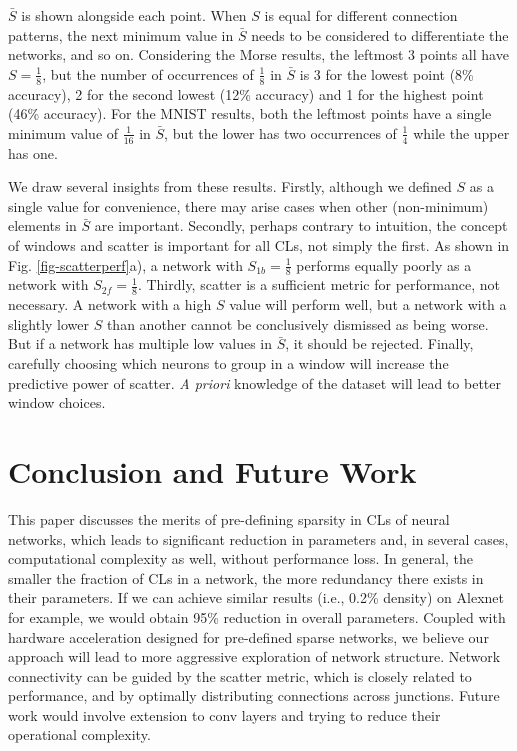 \documentclass[conference]{IEEEtran}
\begin{document}
$\bar{S}$ is shown alongside each point. When $S$ is equal for different connection patterns, the next minimum value in $\bar{S}$ needs to be considered to differentiate the networks, and so on. Considering the Morse results, the leftmost 3 points all have $S = \frac{1}{8}$, but the number of occurrences of $\frac{1}{8}$ in $\bar{S}$ is 3 for the lowest point (8\% accuracy), 2 for the second lowest (12\% accuracy) and 1 for the highest point (46\% accuracy). For the MNIST results, both the leftmost points have a single minimum value of $\frac{1}{16}$ in $\bar{S}$, but the lower has two occurrences of $\frac{1}{4}$ while the upper has one.

We draw several insights from these results. Firstly, although we defined $S$ as a single value for convenience, there may arise cases when other (non-minimum) elements in $\bar{S}$ are important. Secondly, perhaps contrary to intuition, the concept of windows and scatter is important for all CLs, not simply the first. 
As shown in Fig. \ref{fig-scatterperf}a), a network with $S_{1b} = \frac{1}{8}$ performs equally poorly as a network with $S_{2f} = \frac{1}{8}$. 
Thirdly, scatter is a sufficient metric for performance, not necessary. A network with a high $S$ value will perform well, but a network with a slightly lower $S$ than another cannot be conclusively dismissed as being worse. But if a network has multiple low values in $\bar{S}$, it should be rejected. Finally, carefully choosing which neurons to group in a window will increase the predictive power of scatter. \emph{A priori} knowledge of the dataset will lead to better window choices.


\section{Conclusion and Future Work}\label{conc}
This paper discusses the merits of pre-defining sparsity in CLs of neural networks, which leads to significant reduction in parameters and, in several cases, computational complexity as well,
without performance loss. In general, the smaller the fraction of CLs in a network, the more redundancy there exists in their parameters. If we can achieve similar results (i.e., 0.2\% density) on Alexnet for example, we would obtain  95\% reduction in overall parameters. Coupled with hardware acceleration designed for pre-defined sparse networks, we believe our approach will lead to more aggressive exploration of network structure. Network connectivity can be guided by the scatter metric, which is closely related to performance, and by optimally distributing connections across junctions. Future work would involve extension to conv layers and trying to reduce their operational complexity.
\end{document}
